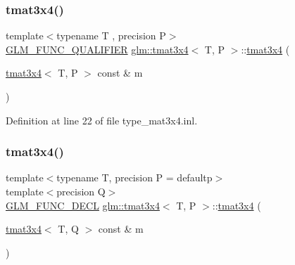 \subsubsection{\texorpdfstring{tmat3x4()}{tmat3x4()}\hspace{0.1cm}{\footnotesize\ttfamily [2/22]}}
{\footnotesize\ttfamily template$<$typename T , precision P$>$ \\
\mbox{\hyperlink{setup_8hpp_a33fdea6f91c5f834105f7415e2a64407}{G\+L\+M\+\_\+\+F\+U\+N\+C\+\_\+\+Q\+U\+A\+L\+I\+F\+I\+ER}} \mbox{\hyperlink{structglm_1_1tmat3x4}{glm\+::tmat3x4}}$<$ T, P $>$\+::\mbox{\hyperlink{structglm_1_1tmat3x4}{tmat3x4}} (\begin{DoxyParamCaption}\item[{\mbox{\hyperlink{structglm_1_1tmat3x4}{tmat3x4}}$<$ T, P $>$ const \&}]{m }\end{DoxyParamCaption})}



Definition at line 22 of file type\+\_\+mat3x4.\+inl.

\mbox{\label{structglm_1_1tmat3x4_a7bb59eb4a55a89437df372f9cc6389e1}} 
\subsubsection{\texorpdfstring{tmat3x4()}{tmat3x4()}\hspace{0.1cm}{\footnotesize\ttfamily [3/22]}}
{\footnotesize\ttfamily template$<$typename T, precision P = defaultp$>$ \\
template$<$precision Q$>$ \\
\mbox{\hyperlink{setup_8hpp_ab2d052de21a70539923e9bcbf6e83a51}{G\+L\+M\+\_\+\+F\+U\+N\+C\+\_\+\+D\+E\+CL}} \mbox{\hyperlink{structglm_1_1tmat3x4}{glm\+::tmat3x4}}$<$ T, P $>$\+::\mbox{\hyperlink{structglm_1_1tmat3x4}{tmat3x4}} (\begin{DoxyParamCaption}\item[{\mbox{\hyperlink{structglm_1_1tmat3x4}{tmat3x4}}$<$ T, Q $>$ const \&}]{m }\end{DoxyParamCaption})}

\mbox{\label{structglm_1_1tmat3x4_a930782f1f709278737022337bd839e66}} 
